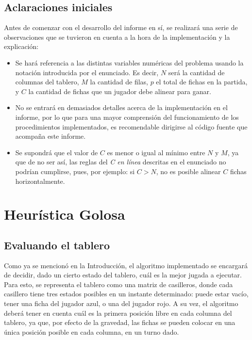 \documentclass[12pt,a4paper]{article}
\begin{document}
    \subsection{Aclaraciones iniciales}
    Antes de comenzar con el desarrollo del informe en sí, se realizará una serie de observaciones que se tuvieron en cuenta a la hora de la implementación y la explicación:
        \begin{itemize}
            \item Se hará referencia a las distintas variables numéricas del problema usando la notación introducida por el enunciado. Es decir, $N$ será la cantidad de columnas del tablero, $M$ la cantidad de filas, $p$ el total de fichas en la partida, y $C$ la cantidad de fichas que un jugador debe alinear para ganar.
            \item No se entrará en demasiados detalles acerca de la implementación en el informe, por lo que para una mayor comprensión del funcionamiento de los procedimientos implementados, es recomendable dirigirse al código fuente que acompaña este informe.
            \item Se supondrá que el valor de $C$ es menor o igual al mínimo entre $N$ y $M$, ya que de no ser así, las reglas del \textit{C en línea} descritas en el enunciado no podrían cumplirse, pues, por ejemplo: si $C > N$, no es posible alinear $C$ fichas horizontalmente.
        \end{itemize}
    

\newpage




\section{Heurística Golosa}


	
	\subsection{Evaluando el tablero}
		
    Como ya se mencionó en la Introducción, el algoritmo implementado se encargará de decidir, dado un cierto estado del tablero, cuál es la mejor jugada a ejecutar. Para esto, se representa el tablero como una matriz de casilleros, donde cada casillero tiene tres estados posibles en un instante determinado: puede estar vacío, tener una ficha del jugador azul, o una del jugador rojo. A su vez, el algoritmo deberá tener en cuenta cuál es la primera posición libre en cada columna del tablero, ya que, por efecto de la gravedad, las fichas se pueden colocar en una única posición posible en cada columna, en un turno dado.
    
\end{document}
